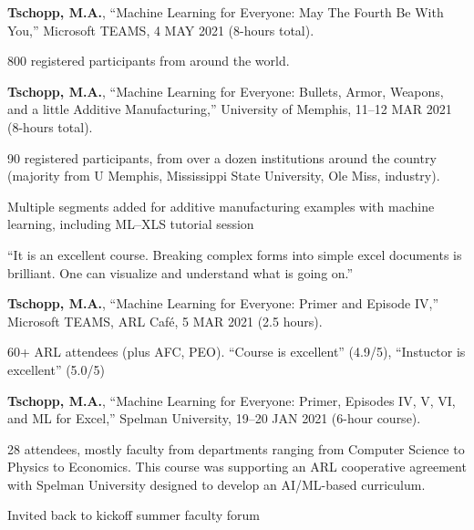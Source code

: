 \begin{cvlist}
\item
\textbf{Tschopp, M.A.}, ``Machine Learning for Everyone: May The Fourth Be With You,'' Microsoft TEAMS, 4 MAY 2021 (8-hours total).
\begin{list2}
\item[$\star$] 800 registered participants from around the world.
\end{list2}

\item
\textbf{Tschopp, M.A.}, ``Machine Learning for Everyone: Bullets, Armor, Weapons, and a little Additive Manufacturing,'' University of Memphis, 11--12 MAR 2021 (8-hours total).
\begin{list2}
\item[$\star$] 90 registered participants, from over a dozen institutions around the country (majority from U Memphis, Mississippi State University, Ole Miss, industry).
\item[$\star$] Multiple segments added for additive manufacturing examples with machine learning, including ML--XLS tutorial session
\item[$\star$] ``It is an excellent course. Breaking complex forms into simple excel documents is brilliant. One can visualize and understand what is going on.''
\end{list2}

\item
\textbf{Tschopp, M.A.}, ``Machine Learning for Everyone: Primer and Episode IV,'' Microsoft TEAMS, ARL Caf\'{e}, 5 MAR 2021 (2.5 hours).
\begin{list2}
\item[$\star$] 60+ ARL attendees (plus AFC, PEO). ``Course is excellent'' (4.9/5), ``Instuctor is excellent'' (5.0/5)
\end{list2}

\item
\textbf{Tschopp, M.A.}, ``Machine Learning for Everyone: Primer, Episodes IV, V, VI, and ML for Excel,'' Spelman University, 19--20 JAN 2021 (6-hour course).
\begin{list2}
\item[$\star$] 28 attendees, mostly faculty from departments ranging from Computer Science to Physics to Economics.  This course was supporting an ARL cooperative agreement with Spelman University designed to develop an AI/ML-based curriculum.  
\item[$\star$] Invited back to kickoff summer faculty forum
\end{list2}


\end{cvlist}
